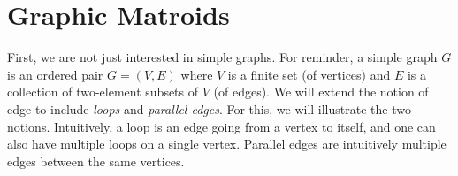 \newpage
\section{Graphic Matroids}\label{sec:graphic-matroids}


First, we are not just interested in simple graphs. For reminder, a simple graph $G$ is an ordered pair $G = (V, E)$ where $V$ is a finite set (of vertices) and $E$ is a collection of two-element subsets of $V$ (of edges). We will extend the notion of edge to include \textit{loops} and \textit{parallel edges}. For this, we will illustrate the two notions. Intuitively, a loop is an edge going from a vertex to itself, and one can also have multiple loops on a single vertex. Parallel edges are intuitively multiple edges between the same vertices.



